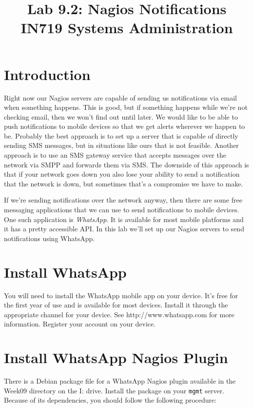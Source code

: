 \documentclass{article}   	%
\title{Lab 9.2:  Nagios Notifications\\ IN719 Systems Administration}
\date{}							%
\begin{document}
\maketitle

\section*{Introduction}
Right now our Nagios servers are capable of sending us notifications via email when something happens.  This is good, but if something happens while we're not checking email, then we won't find out until later.  We would like to be able to push notifications to mobile devices so that we get alerts wherever we happen to be.  Probably the best approach is to set up a server that is capable of directly sending SMS messages, but in situations like ours that is not feasible.  Another approach is to use an SMS gateway service that accepts messages over the network via SMPP and forwards them via SMS.  The downside of this approach is that if your network goes down you also lose your ability to send a notification that the network is down, but sometimes that's a compromise we have to make.

If we're sending notifications over the network anyway, then there are some free messaging applications that we can use to send notifications to mobile devices.  One such application is \emph{WhatsApp}.  It is available for most mobile platforms and it has a pretty accessible API.  In this lab we'll set up our Nagios servers to send notifications using WhatsApp.

\section{Install WhatsApp}
You will need to install the WhatsApp mobile app on your device.  It's free for the first year of use and is available for most devices.  Install it through the appropriate channel for your device. See http://www.whatsapp.com for more information.  Register your account on your device.

\section{Install WhatsApp Nagios Plugin}
There is a Debian package file for a WhatsApp Nagios plugin available in the Week09 directory on the I: drive.  Install the package on your \texttt{mgmt} server.  Because of its dependencies, you should follow the following procedure:
\end{document}
